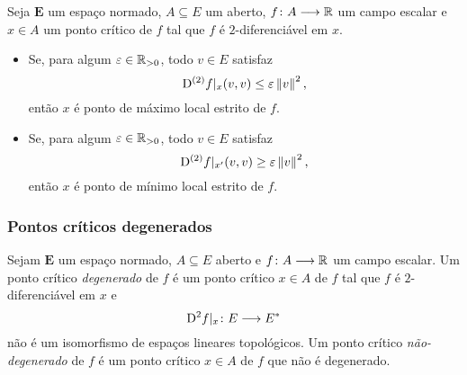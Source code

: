 \begin{proposition}
Seja $\bm E$ um espaço normado, $A \subseteq E$ um aberto, $f\colon \allowbreak A \longrightarrow \mathbb{R}$ um campo escalar e $x \in A$ um ponto crítico de $f$ tal que $f$ é $2$-diferenciável em $x$.
	\begin{itemize}
		\item Se, para algum $\varepsilon \in \mathbb{R}_{>0}$, todo $v \in E$ satisfaz
			\begin{equation*}
			\mathrm{D}^{(2)} f|_x(v,v) \leq \varepsilon \left\Vert{v}\right\Vert^2,
			\end{equation*}
		então $x$ é ponto de máximo local estrito de $f$.
		\item Se, para algum $\varepsilon \in \mathbb{R}_{>0}$, todo $v \in E$ satisfaz
			\begin{equation*}
			\mathrm{D}^{(2)} f|_{x'}(v,v) \geq \varepsilon \left\Vert{v}\right\Vert^2,
			\end{equation*}
		então $x$ é ponto de mínimo local estrito de $f$.
	\end{itemize}
\end{proposition}


\subsubsection{Pontos críticos degenerados}


\begin{definition}
Sejam $\bm E$ um espaço normado, $A \subseteq E$ aberto e $f\colon \allowbreak A \longrightarrow \mathbb{R}$ um campo escalar. Um ponto crítico \emph{degenerado} de $f$ é um ponto crítico $x \in A$ de $f$ tal que $f$ é $2$-diferenciável em $x$ e
	\begin{equation*}
	\mathrm{D}^2 f|_x\colon \allowbreak E \longrightarrow E^{\ast}
	\end{equation*}
não é um isomorfismo de espaços lineares topológicos. %
Um ponto crítico \emph{não-degenerado} de $f$ é um ponto crítico $x \in A$ de $f$ que não é degenerado.
\end{definition}


